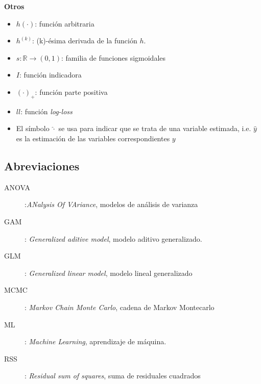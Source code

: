 \documentclass[../../Main/Main.tex]{subfiles}
\begin{document}
\textbf{Otros}
\begin{itemize}[label={}]
	\item $h(\cdot)$: función arbitraria
	\item $h^{(k)}$: (k)-ésima derivada de la función $h$.
	\item $s: \mathbb{R} \rightarrow (0,1)$: familia de funciones sigmoidales
	\item $I$: función indicadora
	\item $(\cdot)_{+}$: función parte positiva
	\item $ll$: función \textit{log-loss}
	\item El símbolo $\hat{\cdot}$ se usa para indicar que se trata de una variable estimada, i.e. $\hat{y}$ es la estimación de las variables correspondientes $y$
\end{itemize}

\subsection*{Abreviaciones}
\begin{description}
	\item[ANOVA]:\textit{ANalysis Of VAriance}, modelos de análisis de varianza
	\item[GAM]: \textit{Generalized aditive model}, modelo aditivo generalizado. 
	\item[GLM]: \textit{Generalized linear model}, modelo lineal generalizado
	\item[MCMC]: \textit{Markov Chain Monte Carlo}, cadena de Markov Montecarlo
	\item[ML]: \textit{Machine Learning}, aprendizaje de máquina.
	\item[RSS]: \textit{Residual sum of squares}, suma de residuales cuadrados
\end{description}
\end{document}
